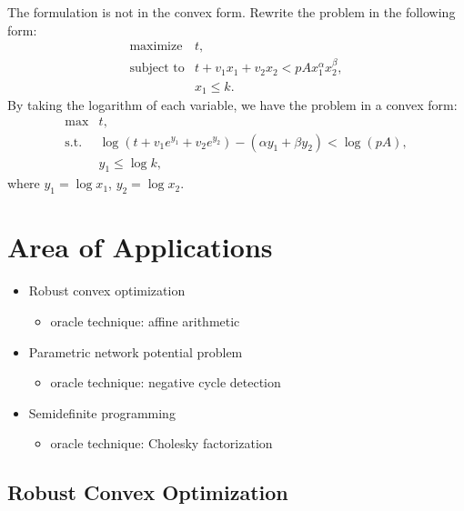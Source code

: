 \documentclass[final,leqno]{siamltex}
\providecommand{\tightlist}{%
  \setlength{\itemsep}{0pt}\setlength{\parskip}{0pt}}
\begin{document}
The formulation is not in the convex form. Rewrite the problem in the following form:
\[\begin{array}{ll}
    \text{maximize}   & t, \\
    \text{subject to} & t  + v_1 x_1  + v_2 x_2 < p A x_1^{\alpha} x_2^{\beta}, \\
                      & x_1 \le k.
  \end{array}
\]
By taking the logarithm of each variable, we have the problem in a convex form:
\begin{equation}\begin{array}{ll}
    \text{max}  & t, \\
    \text{s.t.} & \log(t + v_1 e^{y_1} + v_2 e^{y_2}) - 
                    (\alpha y_1 + \beta y_2) < \log(pA), \\
                & y_1 \le \log k,
  \end{array}
\label{eq:profit-in-cvx-form}\end{equation}
where \(y_1 = \log x_1\), \(y_2 = \log x_2\).

\hypertarget{sec:area-of-applications}{%
\section{Area of Applications}\label{sec:area-of-applications}}

\begin{itemize}
\tightlist
\item
  Robust convex optimization

  \begin{itemize}
  \tightlist
  \item
    oracle technique: affine arithmetic
  \end{itemize}
\item
  Parametric network potential problem

  \begin{itemize}
  \tightlist
  \item
    oracle technique: negative cycle detection
  \end{itemize}
\item
  Semidefinite programming

  \begin{itemize}
  \tightlist
  \item
    oracle technique: Cholesky factorization
  \end{itemize}
\end{itemize}

\hypertarget{sec:robust-convex-optimization}{%
\subsection{Robust Convex Optimization}\label{sec:robust-convex-optimization}}
\end{document}
